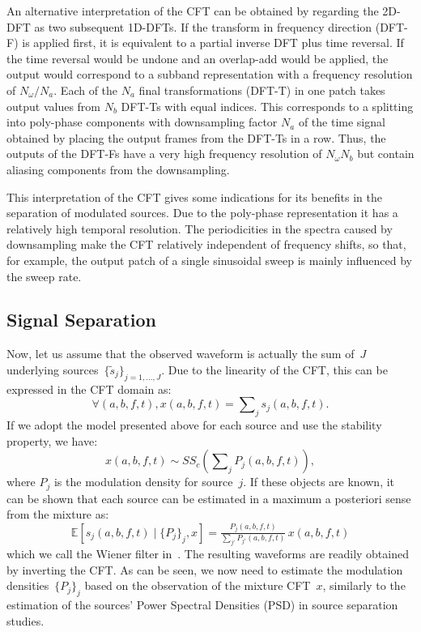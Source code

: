 {{An alternative interpretation of the CFT can be obtained by regarding the 2D-DFT
as two subsequent 1D-DFTs. If the transform in frequency direction (DFT-F) is
applied first, it is equivalent to a partial inverse DFT plus time reversal. If
the time reversal would be undone and an overlap-add would be applied, the
output would correspond to a subband representation with a frequency resolution
of $N_\omega / N_a$. Each of the $N_a$ final transformations (DFT-T) in one
patch takes output values from $N_b$ DFT-Ts with equal indices. This corresponds
to a splitting into poly-phase components with downsampling factor $N_a$ of the
time signal obtained by placing the output frames from the DFT-Ts in a row.
Thus, the outputs of the DFT-Fs have a very high frequency resolution of
$N_\omega N_b$ but contain aliasing components from the downsampling.

This interpretation of the CFT gives some indications for its benefits in the
separation of modulated sources. Due to the poly-phase representation it has a
relatively high temporal resolution. The periodicities in the spectra caused
by downsampling make the CFT relatively independent of frequency shifts, so
that, for example, the output patch of a single sinusoidal sweep is mainly
influenced by the sweep rate.


\subsection{Signal Separation}
Now, let us assume that the observed waveform is actually the sum
of~$J$ underlying sources~$\{ \tilde{s}_{j}\} _{j=1,\dots,J}$.
Due to the linearity of the CFT, this can be
expressed in the CFT domain as:
$$
\forall\left(a,b,f,t\right),x\left(a,b,f,t\right)=\sum\nolimits_{j}s_{j}\left(a,b,f,t\right).
$$
If we adopt the model presented above for each source
and use the stability property, we have:
$$
x\left(a,b,f,t\right)\sim S S_{c}\left(\sum\nolimits_{j}P_{j}\left(a,b,f,t\right)\right),
$$
where $P_{j}$ is the modulation density for source~$j$.
If these objects are known, it can be shown that each source can be
estimated in a maximum a posteriori sense from the mixture as:
\begin{equation}
\mathbb{E}\left[s_{j}\left(a,b,f,t\right)\mid \{ P_{j}\} _{j},x\right]=\tfrac{P_{j}\left(a,b,f,t\right)}{\sum_{j'}P_{j'}\left(a,b,f,t\right)} \, x\left(a,b,f,t\right)\label{eq:alpha_wiener}
\end{equation}
which we call the Wiener filter in~\cite{liutkus15}.
The resulting waveforms are readily obtained by inverting the CFT.\@
As can be seen, we now need to estimate the modulation
densities~$\{ P_{j}\} _{j}$ based on the observation
of the mixture CFT~$x$, similarly to the estimation of
 the sources' Power Spectral Densities (PSD)
in source separation studies.

}}
